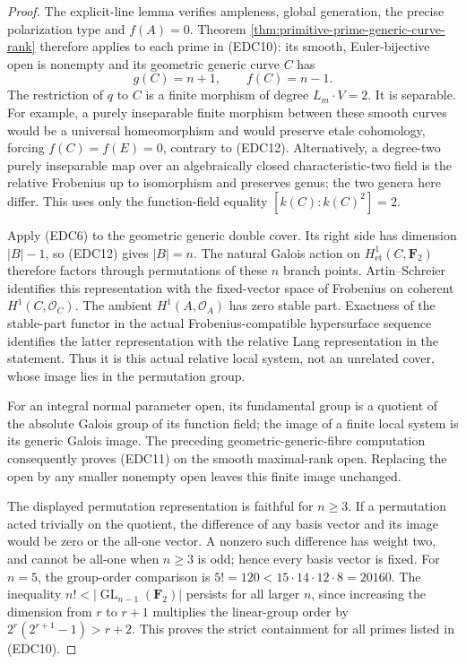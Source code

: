\begin{proof}
The explicit-line lemma verifies ampleness, global generation,
the precise polarization type and \(f(A)=0\). Theorem
\ref{thm:primitive-prime-generic-curve-rank} therefore applies
to each prime in (EDC10): its smooth, Euler-bijective open is
nonempty and its geometric generic curve \(C\) has
\[
                           g(C)=n+1,
                           \qquad f(C)=n-1.          \tag{EDC12}
\]
The restriction of \(q\) to \(C\) is a finite morphism of
degree \(L_m\cdot V=2\). It is separable. For example, a
purely inseparable finite morphism between these smooth curves
would be a universal homeomorphism and would preserve etale
cohomology, forcing \(f(C)=f(E)=0\), contrary to (EDC12).
Alternatively, a degree-two purely inseparable map over an
algebraically closed characteristic-two field is the relative
Frobenius up to isomorphism and preserves genus; the two genera
here differ. This uses only the function-field equality
\([k(C):k(C)^2]=2\).

Apply (EDC6) to the geometric generic double cover. Its right
side has dimension \(|B|-1\), so (EDC12) gives \(|B|=n\).
The natural Galois action on \(H^1_{\mathrm{et}}(C,\mathbf F_2)\)
therefore factors through permutations of these \(n\) branch
points. Artin--Schreier identifies this representation with
the fixed-vector space of Frobenius on coherent \(H^1(C,\mathcal O_C)\).
The ambient \(H^1(A,\mathcal O_A)\) has zero stable part.
Exactness of the stable-part functor in the actual
Frobenius-compatible hypersurface sequence identifies the latter
representation with the relative Lang representation in the
statement. Thus it is this actual relative local system, not
an unrelated cover, whose image lies in the permutation group.

For an integral normal parameter open, its fundamental group is
a quotient of the absolute Galois group of its function field;
the image of a finite local system is its generic Galois image.
The preceding geometric-generic-fibre computation consequently
proves (EDC11) on the smooth maximal-rank open. Replacing the
open by any smaller nonempty open leaves this finite image
unchanged.

The displayed permutation representation is faithful for
\(n\ge3\). If a permutation acted trivially on the quotient,
the difference of any basis vector and its image would be zero
or the all-one vector. A nonzero such difference has weight two,
and cannot be all-one when \(n\ge3\) is odd; hence every
basis vector is fixed. For \(n=5\), the group-order comparison
is \(5!=120<15\cdot14\cdot12\cdot8=20160\). The inequality
\(n!<|\operatorname{GL}_{n-1}(\mathbf F_2)|\) persists for
all larger \(n\), since increasing the dimension from \(r\)
to \(r+1\) multiplies the linear-group order by
\(2^r(2^{r+1}-1)>r+2\). This proves the strict containment
for all primes listed in (EDC10).
\end{proof}

